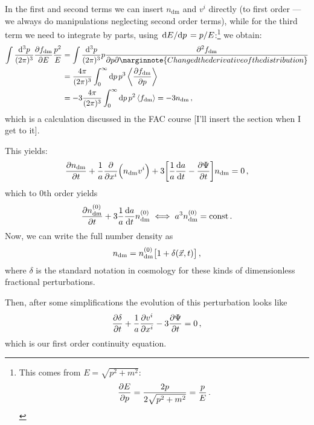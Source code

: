 \documentclass[main.tex]{subfiles}
\begin{document}

In the first and second terms we can insert \(n _{\text{dm}}\) and \(v^{i}\) directly (to first order --- we always do manipulations neglecting second order terms), while for the third term we need to integrate by parts, using \(\dv*{E}{p} = p/E\):\footnote{This comes from \(E = \sqrt{p^2+m^2}\): 
%
\begin{align}
\pdv{E}{p} = \frac{ 2 p }{2 \sqrt{p^2+m^2}} = \frac{p}{E}
\,.
\end{align}
} we obtain: 
%
\begin{align}
\int \frac{\dd[3]{p}}{(2 \pi )^3} \pdv{f _{\text{dm}}}{E} \frac{p^2}{E}
&= \int \frac{ \dd[3]{p}}{(2\pi )^3} p \pdv{f _{\text{dm}}}{p} 
\marginnote{Changed the derivative of the distribution} \\
&= \frac{4 \pi }{(2 \pi )^3} \int_{0}^{ \infty } \dd{p} p^3 \expval{\pdv{f _{\text{dm}}}{p}}  \\
&= -3 \frac{4 \pi }{(2 \pi )^3} \int_{0}^{ \infty } \dd{p} p^2 \expval{f _{\text{dm}}}= -3 n _{\text{dm}}
\,,
\end{align}
%
which is a calculation discussed in the FAC course \cite[]{tissinoFundamentalsAstrophysicsCosmology2020} [I'll insert the section when I get to it].

This yields: 
%
\begin{align}
\pdv{n _{\text{dm}}}{t} + \frac{1}{a} \pdv{}{x^{i}} \qty(n _{\text{dm}} v^{i}) + 3 \qty[\frac{1}{a} \dv{a}{t}  - \pdv{\Psi }{t}] n _{\text{dm}} = 0
\,,
\end{align}
%
which to 0th order yields 
%
\begin{align}
\pdv{n _{\text{dm}}^{(0)}}{t} + 3 \frac{1}{a} \dv{a}{t} n _{\text{dm}}^{(0)} \iff a^3 n _{\text{dm}}^{(0)} = \text{const}
\,.
\end{align}
%
Now, we can write the full number density as 
%
\begin{align}
n _{\text{dm}} = n _{\text{dm}}^{(0)} \qty[1 + \delta (\vec{x}, t)]
\,,
\end{align}
%
where \(\delta \) is the standard notation in cosmology for these kinds of dimensionless fractional perturbations. 

Then, after some simplifications the evolution of this perturbation looks like 
%
\begin{align}
\pdv{ \delta  }{t} + \frac{1}{a} \pdv{v^{i}}{x^{i}} - 3 \pdv{\Psi }{t}=0
\,,
\end{align}
%
which is our first order continuity equation. 
\end{document}
